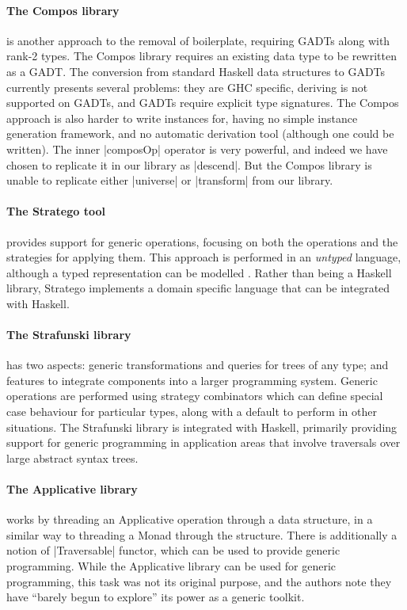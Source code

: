 \paragraph{The Compos library} \citep{bringert:compos} is another approach to the removal of boilerplate, requiring GADTs \citep{spj:gadt} along with rank-2 types. The Compos library requires an existing data type to be rewritten as a GADT. The conversion from standard Haskell data structures to GADTs currently presents several problems: they are GHC specific, deriving is not supported on GADTs, and GADTs require explicit type signatures. The Compos approach is also harder to write instances for, having no simple instance generation framework, and no automatic derivation tool (although one could be written). The inner |composOp| operator is very powerful, and indeed we have chosen to replicate it in our library as |descend|. But the Compos library is unable to replicate either |universe| or |transform| from our library.

\paragraph{The Stratego tool} \citep{stratego} provides support for generic operations, focusing on both the operations and the strategies for applying them. This approach is performed in an \textit{untyped} language, although a typed representation can be modelled \cite{lammel:typed_generic_strategies}. Rather than being a Haskell library, Stratego implements a domain specific language that can be integrated with Haskell.

\paragraph{The Strafunski library} \citep{strafunski, lammel:polymorphic_symphony} has two aspects: generic transformations and queries for trees of any type; and features to integrate components into a larger programming system. Generic operations are performed using strategy combinators which can define special case behaviour for particular types, along with a default to perform in other situations. The Strafunski library is integrated with Haskell, primarily providing support for generic programming in application areas that involve traversals over large abstract syntax trees.

\paragraph{The Applicative library} \citep{mcbride:applicative} works by threading an Applicative operation through a data structure, in a similar way to threading a Monad through the structure. There is additionally a notion of |Traversable| functor, which can be used to provide generic programming. While the Applicative library can be used for generic programming, this task was not its original purpose, and the authors note they have ``barely begun to explore'' its power as a generic toolkit.

